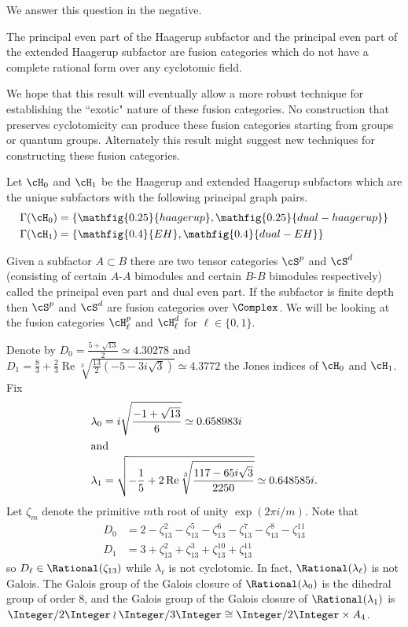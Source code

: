 \documentclass{gtart}
\begin{document}
We answer this question in the negative.

\begin{thm} \label{thm:noncyclotomic}
The principal even part of the Haagerup subfactor and the principal even part of the extended Haagerup subfactor are fusion categories which do not have a complete rational form over any cyclotomic field.
\end{thm}

We hope that this result will eventually allow a more robust technique for establishing the ``exotic" nature of these fusion categories.  No construction that preserves cyclotomicity can produce these fusion categories starting from groups or quantum groups.  Alternately this result might suggest new techniques for constructing these fusion categories.

Let $\cH_0$ and $\cH_1$ be the Haagerup \cite{MR1686551, 0902.1294} and extended Haagerup \cite{0909.4099} subfactors which are the unique subfactors with the following principal graph pairs.
\begin{align*}
\Gamma(\cH_0) & = \left \{ \mathfig{0.25}{haagerup}, \mathfig{0.25}{dual-haagerup} \right \} \\
\Gamma(\cH_1) & = \left \{ \mathfig{0.4}{EH}, \mathfig{0.4}{dual-EH} \right \}
\end{align*}

Given a subfactor $A \subset B$ there are two tensor categories $\cS^p$ and $\cS^d$ (consisting of certain $A$-$A$ bimodules and certain $B$-$B$ bimodules respectively) called the principal even part and dual even part.  If the subfactor is finite depth then $\cS^p$ and $\cS^d$ are fusion categories over $\Complex$.  We will be looking at the fusion categories $\cH_\ell^p$ and $\cH_\ell^d$ for $\ell \in \{0,1\}$.

Denote by $D_0 = \frac{5+\sqrt{13}}{2} \simeq 4.30278$ and $D_1 = \frac{8}{3}+\frac{2}{3} \operatorname{Re} \sqrt[3]{\frac{13}{2} \left(-5-3 i \sqrt{3}\right)} \simeq 4.3772$ the Jones indices of $\cH_0$ and $\cH_1$.  Fix 
\begin{align*}
\lambda_0 & = i \sqrt{\frac{-1+\sqrt{13}}{6}} \simeq 0.658983 i \\
\intertext{and}
\lambda_1& = \sqrt{-\frac{1}{5}+2 \operatorname{Re} \sqrt[3]{\frac{117-  65 i \sqrt{3}}{2250}}} \simeq 0.648585 i.
\end{align*}
 Let $\zeta_m$ denote the primitive $m$th root of unity $\exp(2\pi i/m)$.  Note that
\begin{align*}
D_0 & = 2 -\zeta_{13}^{2} -\zeta_{13}^5 -\zeta_{13}^6 -\zeta_{13}^7-\zeta_{13}^8-\zeta_{13}^{11}\\
D_1 & = 3+ \zeta_{13}^2  + \zeta_{13}^3 + \zeta_{13}^{10} +  \zeta_{13}^{11}
\end{align*}
so $D_\ell \in \Rational(\zeta_{13})$ while $\lambda_\ell$ is not cyclotomic.  In fact, $\Rational(\lambda_\ell)$ is not Galois.   The Galois group of the Galois closure of $\Rational(\lambda_0)$ is the dihedral group of order $8$, and the Galois group of the Galois closure of $\Rational(\lambda_1)$ is $\Integer/2\Integer \wr \Integer/3\Integer \cong \Integer/2\Integer \times A_4$.
\end{document}
